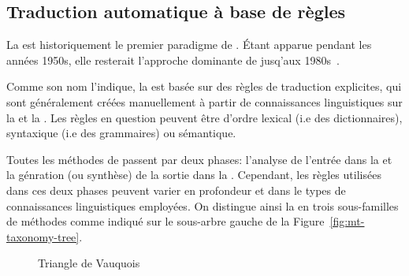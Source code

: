 \subsection{Traduction automatique à base de règles}
\label{sec:rbmt}

La  est historiquement le premier paradigme de . 
Étant apparue pendant les années 1950s, 
elle resterait l'approche dominante de  jusq'aux 1980s~\cite{routledge}.

Comme son nom l'indique, la  est basée sur des règles de traduction explicites,
qui sont généralement créées manuellement à partir de connaissances linguistiques sur la  et la . 
Les règles en question peuvent être d'ordre lexical (i.e des dictionnaires),
syntaxique (i.e des grammaires) ou sémantique.

Toutes les méthodes de  passent par deux phases: 
l'analyse de l'entrée dans la  
et la génration (ou synthèse) de la sortie dans la . 
Cependant, les règles utilisées dans ces deux phases peuvent varier en profondeur
et dans le types de connaissances linguistiques employées. 
On distingue ainsi la  en trois sous-familles de méthodes comme indiqué 
sur le sous-arbre gauche de la Figure~\ref{fig:mt-taxonomy-tree}.

\begin{figure}[h]
    \begin{center}
        
    \end{center}
    \caption{Triangle de Vauquois}
    \label{fig:vauquois-triangle}
\end{figure}


